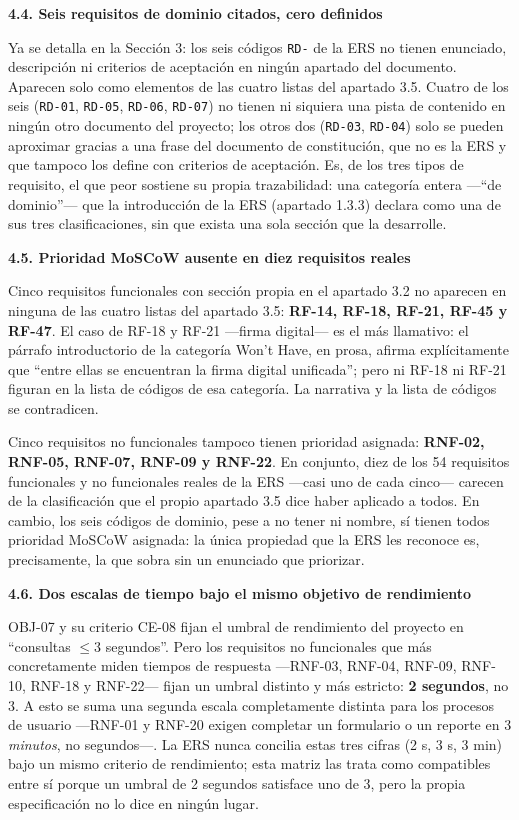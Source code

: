 \documentclass[12pt,varwidth=170mm,border=10pt]{standalone}
\newcommand{\subsectiontitle}[1]{%
  \par\vspace{1.3ex}%
  {\normalfont\large\bfseries #1\par}%
  \vspace{0.5ex}%
}
\begin{document}
\subsectiontitle{4.4. Seis requisitos de dominio citados, cero definidos}

Ya se detalla en la Sección 3: los seis códigos \texttt{RD-} de la ERS no tienen enunciado, descripción ni criterios de aceptación en ningún apartado del documento. Aparecen solo como elementos de las cuatro listas del apartado 3.5. Cuatro de los seis (\texttt{RD-01}, \texttt{RD-05}, \texttt{RD-06}, \texttt{RD-07}) no tienen ni siquiera una pista de contenido en ningún otro documento del proyecto; los otros dos (\texttt{RD-03}, \texttt{RD-04}) solo se pueden aproximar gracias a una frase del documento de constitución, que no es la ERS y que tampoco los define con criterios de aceptación. Es, de los tres tipos de requisito, el que peor sostiene su propia trazabilidad: una categoría entera —``de dominio''— que la introducción de la ERS (apartado 1.3.3) declara como una de sus tres clasificaciones, sin que exista una sola sección que la desarrolle.

\subsectiontitle{4.5. Prioridad MoSCoW ausente en diez requisitos reales}

Cinco requisitos funcionales con sección propia en el apartado 3.2 no aparecen en ninguna de las cuatro listas del apartado 3.5: \textbf{RF-14, RF-18, RF-21, RF-45 y RF-47}. El caso de RF-18 y RF-21 —firma digital— es el más llamativo: el párrafo introductorio de la categoría Won't Have, en prosa, afirma explícitamente que ``entre ellas se encuentran la firma digital unificada''; pero ni RF-18 ni RF-21 figuran en la lista de códigos de esa categoría. La narrativa y la lista de códigos se contradicen.

Cinco requisitos no funcionales tampoco tienen prioridad asignada: \textbf{RNF-02, RNF-05, RNF-07, RNF-09 y RNF-22}. En conjunto, diez de los 54 requisitos funcionales y no funcionales reales de la ERS —casi uno de cada cinco— carecen de la clasificación que el propio apartado 3.5 dice haber aplicado a todos. En cambio, los seis códigos de dominio, pese a no tener ni nombre, sí tienen todos prioridad MoSCoW asignada: la única propiedad que la ERS les reconoce es, precisamente, la que sobra sin un enunciado que priorizar.

\subsectiontitle{4.6. Dos escalas de tiempo bajo el mismo objetivo de rendimiento}

OBJ-07 y su criterio CE-08 fijan el umbral de rendimiento del proyecto en ``consultas $\leq 3$ segundos''. Pero los requisitos no funcionales que más concretamente miden tiempos de respuesta —RNF-03, RNF-04, RNF-09, RNF-10, RNF-18 y RNF-22— fijan un umbral distinto y más estricto: \textbf{2 segundos}, no 3. A esto se suma una segunda escala completamente distinta para los procesos de usuario —RNF-01 y RNF-20 exigen completar un formulario o un reporte en 3 \emph{minutos}, no segundos—. La ERS nunca concilia estas tres cifras (2 s, 3 s, 3 min) bajo un mismo criterio de rendimiento; esta matriz las trata como compatibles entre sí porque un umbral de 2 segundos satisface uno de 3, pero la propia especificación no lo dice en ningún lugar.
\end{document}
